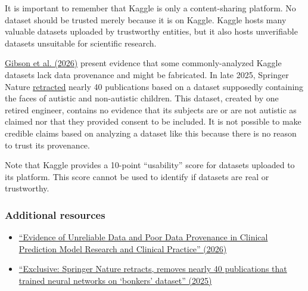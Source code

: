 \documentclass[letterpaper, 12pt]{article}
\begin{document}
It is important to remember that Kaggle is only a content-sharing platform. No dataset should be trusted merely because it is on Kaggle. Kaggle hosts many valuable datasets uploaded by trustworthy entities, but it also hosts unverifiable datasets unsuitable for scientific research.

\href{https://doi.org/10.64898/2026.02.24.26347028}{Gibson et al. (2026)} present evidence that some commonly-analyzed Kaggle datasets lack data provenance and might be fabricated. In late 2025, Springer Nature \href{https://doi.org/10.53053/XFKN9077}{retracted} nearly 40 publications based on a dataset supposedly containing the faces of autistic and non-autistic children. This dataset, created by one retired engineer, contains no evidence that its subjects are or are not autistic as claimed nor that they provided consent to be included. It is not possible to make credible claims based on analyzing a dataset like this because there is no reason to trust its provenance.

Note that Kaggle provides a 10-point ``usability'' score for datasets uploaded to its platform. This score cannot be used to identify if datasets are real or trustworthy.

\subsubsection*{Additional resources}

\begin{itemize}
    \setlength\itemsep{-0.5em}
    \item \href{https://doi.org/10.64898/2026.02.24.26347028}{``Evidence of Unreliable Data and Poor Data Provenance in Clinical Prediction Model Research and Clinical Practice'' (2026)}
    \item \href{https://doi.org/10.53053/XFKN9077}{``Exclusive: Springer Nature retracts, removes nearly 40 publications that trained neural networks on `bonkers' dataset'' (2025)}
\end{itemize}
\end{document}
